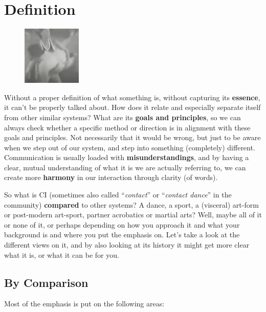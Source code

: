 \chapter{Definition}\label{ch:definition}

\begin{figure}
\centering
\includegraphics[width=0.25\textwidth]{images/definition}
\end{figure}

Without a proper definition of what something is, without capturing its \textbf{essence}, it can't be properly talked about.
How does it relate and especially separate itself from other similar systems?
What are its \textbf{goals and principles}, so we can always check whether a specific method or direction is in alignment with these goals and principles.
Not necessarily that it would be wrong, but just to be aware when we step out of our system, and step into something (completely) different.
Communication is usually loaded with \textbf{misunderstandings}, and by having a clear, mutual understanding of what it is we are actually referring to, we can create more \textbf{harmony} in our interaction through clarity (of words).

So what is CI (sometimes also called ``\textit{contact}'' or ``\textit{contact dance}'' in the community) \textbf{compared} to other systems?
A dance, a sport, a (visceral) art-form or post-modern art-sport, partner acrobatics or martial arts?
Well, maybe all of it or none of it, or perhaps depending on how you approach it and what your background is and where you put the emphasis on.
Let's take a look at the different views on it, and by also looking at its history it might get more clear what it is, or what it can be for you.

\section{By Comparison}\label{sec:by-comparison}

Most of the emphasis is put on the following areas:

